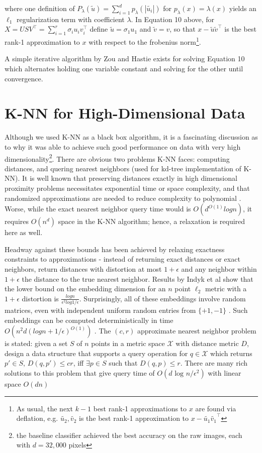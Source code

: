 \documentclass[11pt,letterpaper]{article}
\begin{document}
where one definition of $P_{\lambda}(\tilde{u}) = \sum_{i = 1}^d p_{\lambda}(|\tilde{u_i}|)$ for $p_{\lambda}(x) = \lambda(x)$ yields an $\ell_1$ regularization term with coefficient $\lambda$. In Equation 10 above, for $X = USV^{\top} = \sum_{i = 1}^r \sigma_iu_iv_i^{\top}$ define $\tilde{u} = \sigma_1u_1$ and $\tilde{v} = v$, so that $x - \tilde{u}\tilde{v}^{\top}$ is the best rank-1 approximation to $x$ with respect to the frobenius norm\footnote{As usual, the next $k-1$ best rank-1 approximations to $x$ are found via deflation, e.g. $\tilde{u_2}, \tilde{v_2}$ is the best rank-1 approximation to $x - \tilde{u_1}\tilde{v_1}^{\top}$}. 

A simple iterative algorithm by Zou and Hastie\cite{zou} exists for solving Equation 10 which alternates holding one variable constant and solving for the other until convergence. 

\section{K-NN for High-Dimensional Data}

Although we used K-NN as a black box algorithm, it is a fascinating discussion as to why it was able to achieve such good performance on data with very high dimensionality\footnote{the baseline classifier achieved the best accuracy on the raw images, each with $d = 32,000$ pixels}. There are obvious two problems K-NN faces: computing distances, and quering nearest neighbors (used for kd-tree implementation of K-NN). It is well known that preserving distances exactly in high dimensional proximity problems necessitates exponential time or space complexity, and that randomized approximations are needed to reduce complexity to polynomial \cite{JL}. Worse, while the exact nearest neighbor query time would is $O(d^{O(1)}logn)$, it requires $O(n^d)$ space \cite{clarkson} in the K-NN algorithm; hence, a relaxation is required here as well. 

 Headway against these bounds has been achieved by relaxing exactness constraints to approximations - instead of returning exact distances or exact neighbors, return distances with distortion at most $1 + \epsilon$ and any neighbor within $1 + \epsilon$ the distance to the true nearest neighbor. Results by Indyk et al show that the lower bound on the embedding dimension for an $n$ point $\ell_2$ metric with a $1 + \epsilon$ distortion is $\frac{logn}{\epsilon^2log1/\epsilon}$. Surprisingly, all of these embeddings involve random matrices, even with independent uniform random entries from $\{+1, -1\}$ \cite{achlioptas}. Such embeddings can be computed deterministically in time $O(n^2d(logn + 1/\epsilon)^{O(1)})$ \cite{engebretsen}. The $(c, r)$ approximate nearest neighbor problem is stated: given a set $S$ of $n$ points in a metric space $\mathcal{X}$ with distance metric $D$, design a data structure that supports a query operation for $q \in \mathcal{X}$ which returns $p' \in S$, $D(q, p') \leq cr$, iff  $\exists p \in S$ such that $D(q, p) \leq r$. There are many rich solutions to this problem that give query time of $O(d \text{ log }n/{\epsilon^2})$ with linear space $O(dn)$ \cite{kushilevitz}
\end{document}

